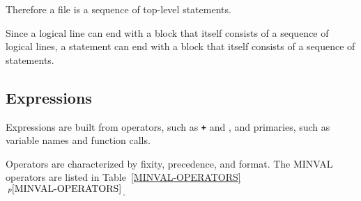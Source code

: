 \documentclass[12pt]{article}
\newcommand{\TT}[1]{{\tt \bfseries #1}}
\newcommand{\itemref}[1]{\ref{#1}$\,^{p\pageref{#1}}$}
\begin{document}
Therefore a file is a sequence of top-level statements.

Since a logical line can end with a block that itself consists
of a sequence of logical lines, a statement can end with
a block that itself consists of a sequence of statements.


\subsection{Expressions}

Expressions are built from operators, such as \TT{+} and \TT{*},
and primaries, such as variable names and function calls.

Operators are characterized by fixity, precedence, and format.
The MINVAL operators are listed in Table~\itemref{MINVAL-OPERATORS}.
\end{document}
